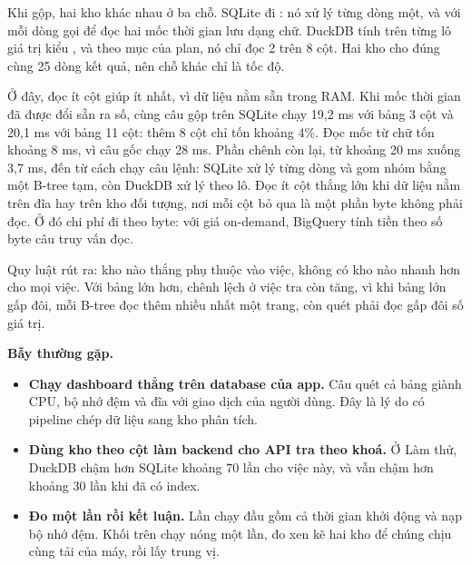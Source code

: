 Khi gộp, hai kho khác nhau ở ba chỗ. SQLite đi : nó xử lý từng dòng một, và với mỗi dòng gọi  để đọc hai mốc thời gian lưu dạng chữ. DuckDB tính trên từng lô giá trị kiểu , và theo mục  của plan, nó chỉ đọc 2 trên 8 cột. Hai kho cho đúng cùng 25 dòng kết quả, nên chỗ khác chỉ là tốc độ.

Ở đây, đọc ít cột giúp ít nhất, vì dữ liệu nằm sẵn trong RAM. Khi mốc thời gian đã được đổi sẵn ra số, cùng câu gộp trên SQLite chạy 19,2 ms với bảng 3 cột và 20,1 ms với bảng 11 cột: thêm 8 cột chỉ tốn khoảng 4\%. Đọc mốc từ chữ tốn khoảng 8 ms, vì câu gốc chạy 28 ms. Phần chênh còn lại, từ khoảng 20 ms xuống 3,7 ms, đến từ cách chạy câu lệnh: SQLite xử lý từng dòng và gom nhóm bằng một B-tree tạm, còn DuckDB xử lý theo lô.
Đọc ít cột thắng lớn khi dữ liệu nằm trên đĩa hay trên kho đối tượng, nơi mỗi cột bỏ qua là một phần byte không phải đọc. Ở đó chi phí đi theo byte: với giá on-demand, BigQuery tính tiền theo số byte câu truy vấn đọc.

Quy luật rút ra: kho nào thắng phụ thuộc vào việc, không có kho nào nhanh hơn cho mọi việc. Với bảng lớn hơn, chênh lệch ở việc tra còn tăng, vì khi bảng lớn gấp đôi, mỗi B-tree đọc thêm nhiều nhất một trang, còn quét phải đọc gấp đôi số giá trị.

\begin{luuy}
\textbf{Bẫy thường gặp.}
\begin{itemize}
  \item \textbf{Chạy dashboard thẳng trên database của app.} Câu quét cả bảng giành CPU, bộ nhớ đệm và đĩa với giao dịch của người dùng. Đây là lý do có pipeline chép dữ liệu sang kho phân tích.
  \item \textbf{Dùng kho theo cột làm backend cho API tra theo khoá.} Ở Làm thử, DuckDB chậm hơn SQLite khoảng 70 lần cho việc này, và vẫn chậm hơn khoảng 30 lần khi đã có index.
  \item \textbf{Đo một lần rồi kết luận.} Lần chạy đầu gồm cả thời gian khởi động và nạp bộ nhớ đệm. Khối trên chạy nóng một lần, đo xen kẽ hai kho để chúng chịu cùng tải của máy, rồi lấy trung vị.
\end{itemize}
\end{luuy}


